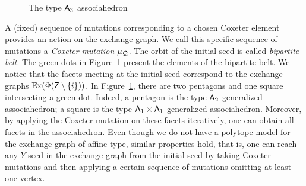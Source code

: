 \begin{figure}[ht]
\caption{The type $\mathsf{A}_3$ associahedron}\label{fig_asso_A3_intro}
\end{figure}

A (fixed) sequence of mutations corresponding to a chosen Coxeter element provides an action on the exchange graph. We call this specific sequence of mutations a \emph{Coxeter mutation} $\mu_{\mathcal{Q}}$. The orbit of the initial seed is called \emph{bipartite belt}. The green dots in Figure~\ref{fig_asso_A3_intro} present the elements of the bipartite belt.
We notice that the facets meeting at the initial seed correspond to the exchange graphs $\operatorname{Ex}(\Phi(\mathsf{Z}\setminus \{i\}))$. In Figure~\ref{fig_asso_A3_intro}, there are two pentagons and one square intersecting a green dot. Indeed, a pentagon is the type $\mathsf{A}_2$ generalized associahedron; a square is the type $\mathsf{A}_1 \times \mathsf{A}_1$ generalized associahedron. Moreover, by applying the Coxeter mutation on these facets iteratively, one can obtain all facets in the associahedron. 
Even though we do not have a polytope model for the exchange graph of affine type, similar properties hold, that is, one can reach any $Y$-seed in the exchange graph from the initial seed by taking Coxeter mutations and then applying a certain sequence of mutations omitting at least one vertex. 

